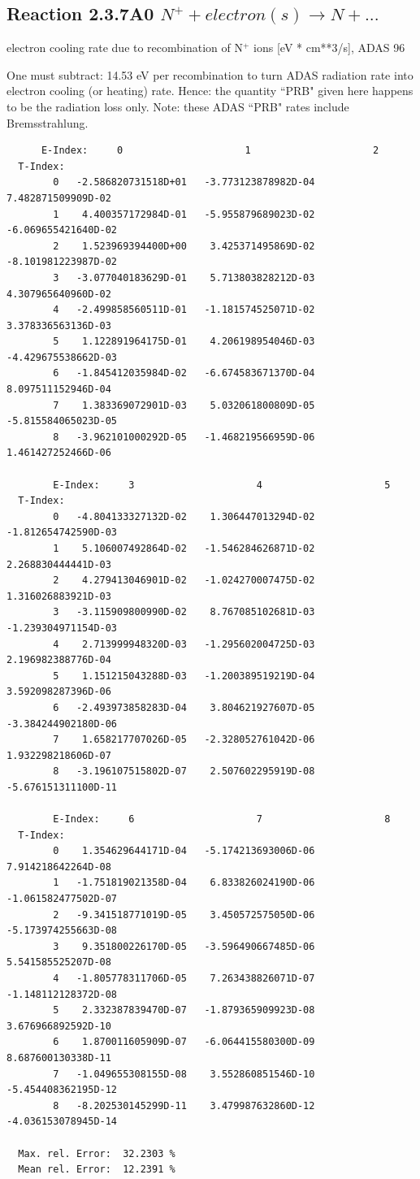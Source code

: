 \documentclass[12pt,dvips]{article}
\begin{document}
\subsection{
  Reaction 2.3.7A0  $N^+ + electron(s) \rightarrow N   + ... $
}
electron cooling rate due to recombination of N$^+$ ions [eV *
cm**3/s], ADAS 96

One must subtract: 14.53 eV per recombination to turn ADAS radiation
rate into electron cooling (or heating) rate. Hence: the quantity
``PRB" given here happens to be the radiation loss only. Note: these
ADAS ``PRB" rates include Bremsstrahlung.

\begin{small}\begin{verbatim}
      E-Index:     0                     1                     2
  T-Index:
        0   -2.586820731518D+01   -3.773123878982D-04    7.482871509909D-02
        1    4.400357172984D-01   -5.955879689023D-02   -6.069655421640D-02
        2    1.523969394400D+00    3.425371495869D-02   -8.101981223987D-02
        3   -3.077040183629D-01    5.713803828212D-03    4.307965640960D-02
        4   -2.499858560511D-01   -1.181574525071D-02    3.378336563136D-03
        5    1.122891964175D-01    4.206198954046D-03   -4.429675538662D-03
        6   -1.845412035984D-02   -6.674583671370D-04    8.097511152946D-04
        7    1.383369072901D-03    5.032061800809D-05   -5.815584065023D-05
        8   -3.962101000292D-05   -1.468219566959D-06    1.461427252466D-06

        E-Index:     3                     4                     5
  T-Index:
        0   -4.804133327132D-02    1.306447013294D-02   -1.812654742590D-03
        1    5.106007492864D-02   -1.546284626871D-02    2.268830444441D-03
        2    4.279413046901D-02   -1.024270007475D-02    1.316026883921D-03
        3   -3.115909800990D-02    8.767085102681D-03   -1.239304971154D-03
        4    2.713999948320D-03   -1.295602004725D-03    2.196982388776D-04
        5    1.151215043288D-03   -1.200389519219D-04    3.592098287396D-06
        6   -2.493973858283D-04    3.804621927607D-05   -3.384244902180D-06
        7    1.658217707026D-05   -2.328052761042D-06    1.932298218606D-07
        8   -3.196107515802D-07    2.507602295919D-08   -5.676151311100D-11

        E-Index:     6                     7                     8
  T-Index:
        0    1.354629644171D-04   -5.174213693006D-06    7.914218642264D-08
        1   -1.751819021358D-04    6.833826024190D-06   -1.061582477502D-07
        2   -9.341518771019D-05    3.450572575050D-06   -5.173974255663D-08
        3    9.351800226170D-05   -3.596490667485D-06    5.541585525207D-08
        4   -1.805778311706D-05    7.263438826071D-07   -1.148112128372D-08
        5    2.332387839470D-07   -1.879365909923D-08    3.676966892592D-10
        6    1.870011605909D-07   -6.064415580300D-09    8.687600130338D-11
        7   -1.049655308155D-08    3.552860851546D-10   -5.454408362195D-12
        8   -8.202530145299D-11    3.479987632860D-12   -4.036153078945D-14

  Max. rel. Error:  32.2303 %
  Mean rel. Error:  12.2391 %

\end{verbatim}\end{small}
\end{document}
